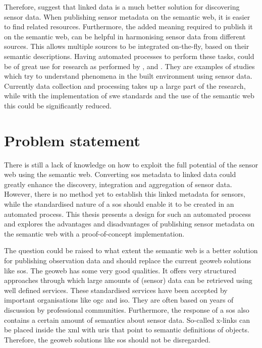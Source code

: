 Therefore, \citeauthor{SSW:Atkinson} suggest that linked data is a much better solution for discovering sensor data. When publishing sensor metadata on the semantic web, it is easier to find related resources. Furthermore, the added meaning required to publish it on the semantic web, can be helpful in harmonising sensor data from different sources. This allows multiple sources to be integrated on-the-fly, based on their semantic descriptions. Having automated processes to perform these tasks, could be of great use for research as performed by \cite{UC:vanderHoeven}, \cite{UC:Hotterdam} and \cite{UC:Theunisse}. They are examples of studies which try to understand phenomena in the built environment using sensor data. Currently data collection and processing takes up a large part of the research, while with the implementation of \ac{swe} standards and the use of the semantic web this could be significantly reduced.  


\section{Problem statement}
There is still a lack of knowledge on how to exploit the full potential of the sensor web using the semantic web. Converting \ac{sos} metadata to linked data could greatly enhance the discovery, integration and aggregation of sensor data. However, there is no method yet to establish this linked metadata for sensors, while the standardised nature of a \ac{sos} should enable it to be created in an automated process. This thesis presents a design for such an automated process and explores the advantages and disadvantages of publishing sensor metadata on the semantic web with a proof-of-concept implementation. 

The question could be raised to what extent the semantic web is a better solution for publishing observation data and should replace the current geoweb solutions like \ac{sos}. The geoweb has some very good qualities. It offers very structured approaches through which large amounts of (sensor) data can be retrieved using well defined services. These standardised services have been accepted by important organisations like \ac{ogc} and \ac{iso}. They are often based on years of discussion by professional communities. Furthermore, the response of a \ac{sos} also contains a certain amount of semantics about sensor data. So-called x-links can be placed inside the \ac{xml} with \ac{uri}s that point to semantic definitions of objects. Therefore, the geoweb solutions like \ac{sos} should not be disregarded.

